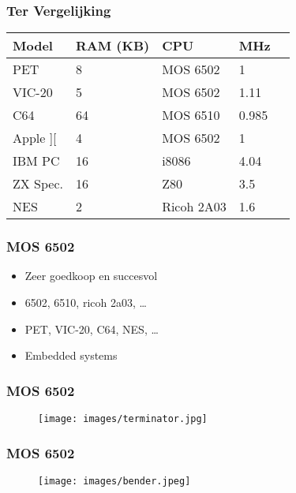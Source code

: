 \documentclass[aspectratio=43]{uva-inf-presentation}
\begin{document}

\begin{frame}
\frametitle{Ter Vergelijking}

\begin{tabular}{|l|l|l|l|l|}
\hline Model & RAM (KB) & CPU & MHz \\ \hline
PET & 8 & MOS 6502 & 1 \\
VIC-20 & 5 & MOS 6502 & 1.11 \\
C64 & 64 & MOS 6510 & 0.985 \\ \hline
Apple ][ & 4 & MOS 6502 & 1 \\
IBM PC & 16 & i8086 & 4.04 \\
ZX Spec. & 16 & Z80 & 3.5 \\ \hline
NES & 2 & Ricoh 2A03 & 1.6 \\ \hline
\end{tabular}

\end{frame}


\begin{frame}
\frametitle{MOS 6502}

\begin{itemize}
\item Zeer goedkoop en succesvol
\item 6502, 6510, ricoh 2a03, \dots
\item PET, VIC-20, C64, NES, \dots
\item Embedded systems
\end{itemize}

\end{frame}


\begin{frame}
\frametitle{MOS 6502}

\begin{figure}
\texttt{[image: images/terminator.jpg]}
\end{figure}

\end{frame}


\begin{frame}
\frametitle{MOS 6502}

\begin{figure}
\texttt{[image: images/bender.jpeg]}
\end{figure}

\end{frame}
\end{document}
